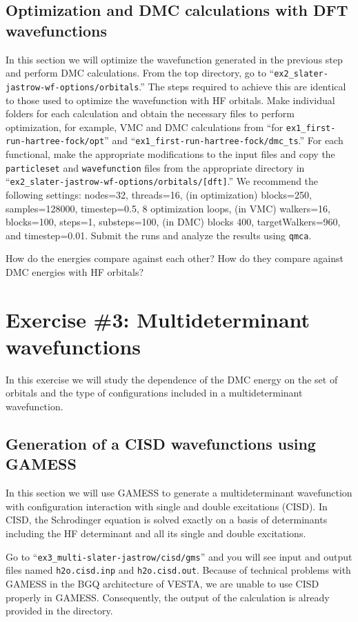 \subsection{Optimization and DMC calculations with DFT wavefunctions}
In this section we will optimize the wavefunction generated in the previous step and
perform DMC calculations. From the top directory, go to “\texttt{ex2\_slater-jastrow-wf-options/orbitals}.”
The steps required to achieve this are identical to those used to optimize the wavefunction
with HF orbitals. Make individual folders for each calculation and obtain the necessary files
to perform optimization, for example, VMC and DMC calculations from ``for \texttt{ex1\_first-run-hartree-fock/opt}'' and ``\texttt{ex1\_first-run-hartree-fock/dmc\_ts}.''
For each functional, make the appropriate modifications to the input files and copy the \texttt{particleset} and \texttt{wavefunction} files from the appropriate directory in “\texttt{ex2\_slater-jastrow-wf-options/orbitals/[dft]}.” We
recommend the following settings: nodes=32, threads=16, (in optimization) blocks=250,
samples=128000, timestep=0.5, 8 optimization loops, (in VMC) walkers=16, blocks=100,
steps=1, substeps=100, (in DMC) blocks 400, targetWalkers=960, and timestep=0.01. Submit
the runs and analyze the results using \texttt{qmca}.

How do the energies compare against each other? How do they compare against DMC
energies with HF orbitals?
\section{Exercise \#3: Multideterminant wavefunctions}
In this exercise we will study the dependence of the DMC energy on the set of orbitals
and the type of configurations included in a multideterminant wavefunction. 

\subsection{Generation of a CISD wavefunctions using GAMESS}
In this section we will use GAMESS to generate a multideterminant wavefunction with
configuration interaction with single and double excitations (CISD). In CISD, the Schrodinger equation is solved exactly on a basis of determinants 
including the HF determinant and all its single and double excitations. 

Go to ``\texttt{ex3\_multi-slater-jastrow/cisd/gms}'' and you will see input and output files named \texttt{h2o.cisd.inp} and \texttt{h2o.cisd.out}. Because of technical problems with GAMESS in the BGQ architecture of VESTA, we are unable to use CISD properly in GAMESS. Consequently, the output of the calculation is already provided in the directory. 

